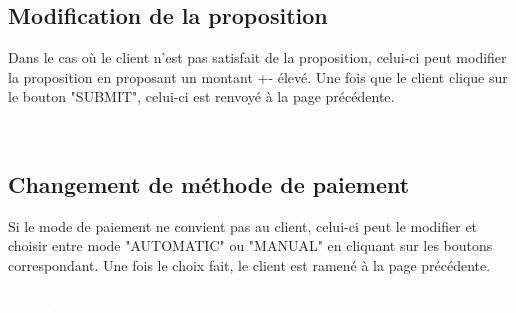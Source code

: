 \subsection{Modification de la proposition}
\begin{flushleft}
Dans le cas où le client n'est pas satisfait de la proposition, celui-ci peut modifier la proposition en proposant un montant +- élevé. Une fois que le client clique sur le bouton "SUBMIT", celui-ci est renvoyé à la page précédente.
\end{flushleft}
\begin{figure}[h]
\centering
\includegraphics[width = 1]{extension-maxime/interface/img/proposal.png}
\end{figure}

\subsection{Changement de méthode de paiement}
\begin{flushleft}
Si le mode de paiement ne convient pas au client, celui-ci peut le modifier et choisir entre mode "AUTOMATIC" ou "MANUAL" en cliquant sur les boutons correspondant. Une fois le choix fait, le client est ramené à la page précédente.
\end{flushleft}
\begin{figure}[h]
\centering
\includegraphics[width = 1]{extension-maxime/interface/img/paiement-method.png}
\end{figure}

